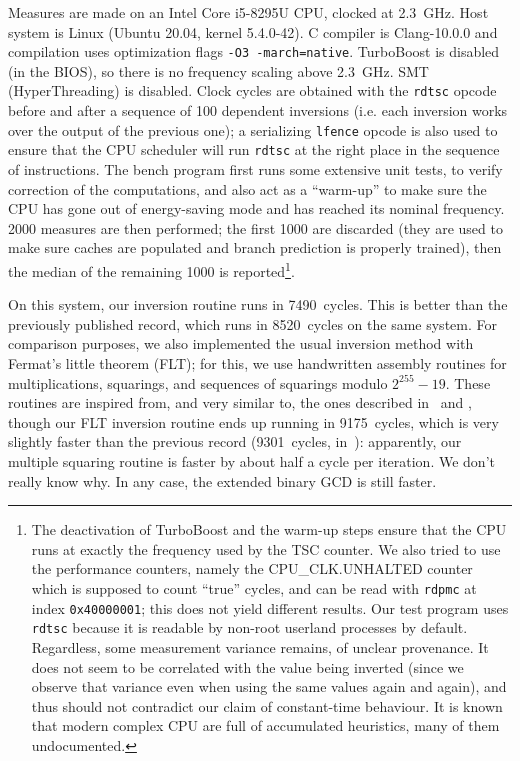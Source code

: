 \documentclass{llncs}
\begin{document}
Measures are made on an Intel Core i5-8295U CPU, clocked at 2.3~GHz.
Host system is Linux (Ubuntu 20.04, kernel 5.4.0-42). C compiler is
Clang-10.0.0 and compilation uses optimization flags
\verb+-O3 -march=native+. TurboBoost is disabled (in the BIOS), so there
is no frequency scaling above 2.3~GHz. SMT (HyperThreading) is disabled.
Clock cycles are obtained with the \verb+rdtsc+ opcode before and after
a sequence of 100 dependent inversions (i.e. each inversion works over
the output of the previous one); a serializing \verb+lfence+ opcode is
also used to ensure that the CPU scheduler will run \verb+rdtsc+ at the
right place in the sequence of instructions. The bench program first
runs some extensive unit tests, to verify correction of the
computations, and also act as a ``warm-up'' to make sure the CPU has
gone out of energy-saving mode and has reached its nominal frequency.
2000 measures are then performed; the first 1000 are discarded (they are
used to make sure caches are populated and branch prediction is properly
trained), then the median of the remaining 1000 is reported\footnote{The
deactivation of TurboBoost and the warm-up steps ensure that the CPU
runs at exactly the frequency used by the TSC counter. We also tried to
use the performance counters, namely the CPU\_CLK.UNHALTED counter which
is supposed to count ``true'' cycles, and can be read with
\texttt{rdpmc} at index \texttt{0x40000001}; this does not yield
different results. Our test program uses \texttt{rdtsc} because it is
readable by non-root userland processes by default. Regardless, some
measurement variance remains, of unclear provenance. It does not seem to
be correlated with the value being inverted (since we observe that
variance even when using the same values again and again), and thus
should not contradict our claim of constant-time behaviour. It is known
that modern complex CPU are full of accumulated heuristics, many of them
undocumented.}.

On this system, our inversion routine runs in 7490~cycles. This is
better than the previously published record\cite{BerYan2019}, which runs
in 8520~cycles on the same system. For comparison purposes, we also
implemented the usual inversion method with Fermat's little theorem
(FLT); for this, we use handwritten assembly routines for
multiplications, squarings, and sequences of squarings modulo
$2^{255}-19$. These routines are inspired from, and very similar to, the
ones described in~\cite{OliLopHisFazRod2017} and \cite{NatSar2018},
though our FLT inversion routine ends up running in 9175~cycles, which
is very slightly faster than the previous record (9301~cycles,
in~\cite{NatSar2018}): apparently, our multiple squaring routine is
faster by about half a cycle per iteration. We don't really know why. In
any case, the extended binary GCD is still faster.
\end{document}
